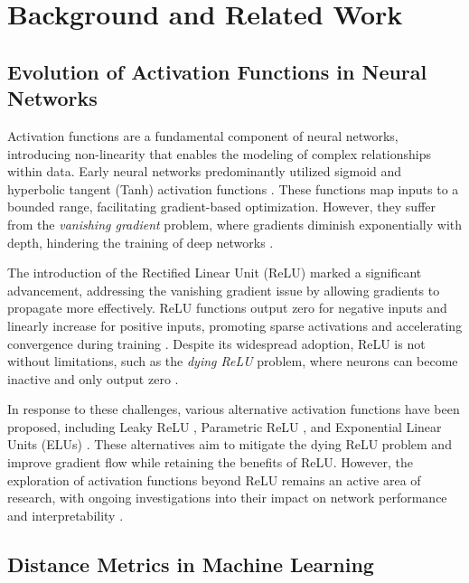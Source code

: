  
\section{Background and Related Work}

\subsection{Evolution of Activation Functions in Neural Networks}

Activation functions are a fundamental component of neural networks, introducing non-linearity that enables the modeling of complex relationships within data. Early neural networks predominantly utilized sigmoid and hyperbolic tangent (Tanh) activation functions \citep{rosenblatt1958perceptron, taillade1989hyperbolic}. These functions map inputs to a bounded range, facilitating gradient-based optimization. However, they suffer from the \textit{vanishing gradient} problem, where gradients diminish exponentially with depth, hindering the training of deep networks \citep{glorot2010understanding}.

The introduction of the Rectified Linear Unit (ReLU) \citep{nair2010rectified} marked a significant advancement, addressing the vanishing gradient issue by allowing gradients to propagate more effectively. ReLU functions output zero for negative inputs and linearly increase for positive inputs, promoting sparse activations and accelerating convergence during training \citep{he2015delving}. Despite its widespread adoption, ReLU is not without limitations, such as the \textit{dying ReLU} problem, where neurons can become inactive and only output zero \citep{maas2013rectifier}.

In response to these challenges, various alternative activation functions have been proposed, including Leaky ReLU \citep{maas2013rectifier}, Parametric ReLU \citep{he2015delving}, and Exponential Linear Units (ELUs) \citep{clevert2015fast}. These alternatives aim to mitigate the dying ReLU problem and improve gradient flow while retaining the benefits of ReLU. However, the exploration of activation functions beyond ReLU remains an active area of research, with ongoing investigations into their impact on network performance and interpretability \citep{ramachandran2017searching}.

\subsection{Distance Metrics in Machine Learning}

